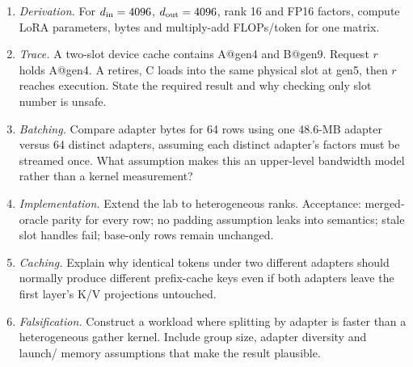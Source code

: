 \ExercisesSection
\begin{enumerate}
\item \emph{Derivation.} For $d_{\rm in}=4096$, $d_{\rm out}=4096$, rank 16 and FP16
factors, compute LoRA parameters, bytes and multiply-add FLOPs/token for one matrix.
\item \emph{Trace.} A two-slot device cache contains A@gen4 and B@gen9. Request $r$
holds A@gen4. A retires, C loads into the same physical slot at gen5, then $r$ reaches
execution. State the required result and why checking only slot number is unsafe.
\item \emph{Batching.} Compare adapter bytes for 64 rows using one 48.6-MB adapter
versus 64 distinct adapters, assuming each distinct adapter's factors must be streamed
once. What assumption makes this an upper-level bandwidth model rather than a kernel
measurement?
\item \emph{Implementation.} Extend the lab to heterogeneous ranks. Acceptance:
merged-oracle parity for every row; no padding assumption leaks into semantics; stale
slot handles fail; base-only rows remain unchanged.
\item \emph{Caching.} Explain why identical tokens under two different adapters should
normally produce different prefix-cache keys even if both adapters leave the first
layer's K/V projections untouched.
\item \emph{Falsification.} Construct a workload where splitting by adapter is faster
than a heterogeneous gather kernel. Include group size, adapter diversity and launch/
memory assumptions that make the result plausible.
\end{enumerate}


